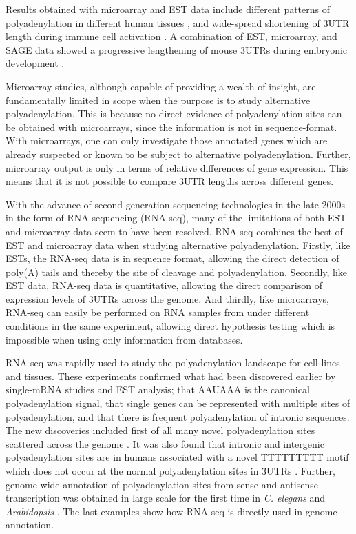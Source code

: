 Results obtained with microarray and EST data include different patterns of
polyadenylation in different human tissues \cite{zhang_biased_2005}, and
wide-spread shortening of 3\p UTR length during immune cell activation
\cite{sandberg_proliferating_2008}. A combination of EST, microarray, and SAGE
data showed a progressive lengthening of mouse 3\p UTRs during embryonic
development \cite{ji_progressive_2009}.

Microarray studies, although capable of providing a wealth of insight, are
fundamentally limited in scope when the purpose is to study alternative
polyadenylation. This is because no direct evidence of polyadenylation sites
can be obtained with microarrays, since the information is not in
sequence-format. With microarrays, one can only investigate those annotated
genes which are already suspected or known to be subject to alternative
polyadenylation. Further, microarray output is only in terms of relative
differences of gene expression. This means that it is not possible to compare
3\p UTR lengths across different genes.

With the advance of second generation sequencing technologies in the late 2000s
in the form of RNA sequencing (RNA-seq), many of the limitations of both EST
and microarray data seem to have been resolved. RNA-seq combines the best of
EST and microarray data when studying alternative polyadenylation. Firstly,
like ESTs, the RNA-seq data is in sequence format, allowing the direct
detection of poly(A) tails and thereby the site of cleavage and
polyadenylation. Secondly, like EST data, RNA-seq data is quantitative,
allowing the direct comparison of expression levels of 3\p UTRs across the
genome. And thirdly, like microarrays, RNA-seq can easily be performed on RNA
samples from under different conditions in the same experiment, allowing direct
hypothesis testing which is impossible when using only information from
databases. 

RNA-seq was rapidly used to study the polyadenylation landscape for cell lines
and tissues. These experiments confirmed what had been discovered earlier by
single-mRNA studies and EST analysis; that AAUAAA is the canonical
polyadenylation signal, that single genes can be represented with multiple
sites of polyadenylation, and that there is frequent polyadenylation of
intronic sequences. The new discoveries included first of all many novel
polyadenylation sites scattered across the genome
\cite{ozsolak_comprehensive_2010, derti_quantitative_2012}. It was also found
that intronic and intergenic polyadenylation sites are in humans associated
with a novel TTTTTTTTT motif which does not occur at the normal polyadenylation
sites in 3\p UTRs \cite{ozsolak_comprehensive_2010}. Further, genome wide
annotation of polyadenylation sites from sense and antisense transcription was
obtained in large scale for the first time in \textit{C. elegans} and
\textit{Arabidopsis} \cite{mangone_landscape_2010, wu_genome-wide_2011}. The
last examples show how RNA-seq is directly used in genome annotation.

